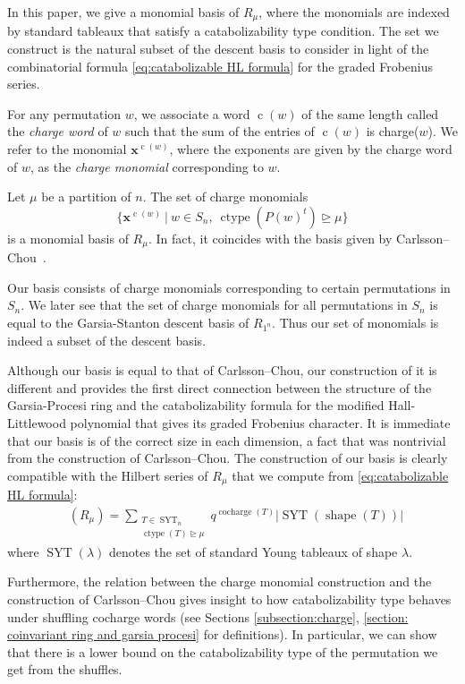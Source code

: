 \documentclass[10pt]{amsart}
\theoremstyle{plain}
\theoremstyle{definition}
\theoremstyle{plain}
\theoremstyle{plain}
\theoremstyle{remark}
\theoremstyle{plain}
\theoremstyle{plain}
\DeclareMathOperator{\cocharge}{cocharge}
\DeclareMathOperator{\syt}{SYT}
\DeclareMathOperator{\ctype}{ctype}
\DeclareMathOperator{\Hilb}{Hilb}
\DeclareMathOperator{\shape}{shape}
\DeclareMathOperator{\cw}{c}
\DeclareMathOperator{\Hilbq}{\Hilb_q}
\begin{document}
In this paper, we give a monomial basis of $R_{\mu}$, where the monomials are indexed by standard tableaux that satisfy a catabolizability type condition. 
The set we construct is the natural subset of the descent basis to consider in light of the combinatorial formula \eqref{eq:catabolizable HL formula} for the graded Frobenius series.


For any permutation $w$, we associate a word $\cw(w)$ of the same length called the \textit{charge word} of $w$ such that the sum of the entries of $\cw(w)$ is charge($w$).
We refer to the monomial $\mathbf{x}^{\cw(w)}$, where the exponents are given by the charge word of $w$, as the \textit{charge monomial} corresponding to $w$.


\begin{thm1}
\makeatletter{}\makeatother
 Let $\mu$ be a partition of $n$.
     The set of charge monomials 
     \[ \{\mathbf{x}^{\cw(w)}\ | \ w\in S_n, \ \ctype(P(w)^t)\unrhd\mu\}\]
    is a monomial basis of $R_{\mu}$.
    In fact, it coincides with the basis given by Carlsson--Chou~\cite{CC}.
\end{thm1}

Our basis consists of charge monomials corresponding to certain permutations in $S_n$. We later see that the set of charge monomials for all permutations in $S_n$ is equal to the Garsia-Stanton descent basis of $R_{1^n}$. Thus our set of monomials is indeed a subset of the descent basis.  

Although our basis is equal to that of Carlsson--Chou, our construction of it is different and provides the first direct connection between the structure of the Garsia-Procesi ring and the catabolizability formula for the modified Hall-Littlewood polynomial that gives its graded Frobenius character. 
It is immediate that our basis is of the correct size in each dimension, a fact that was nontrivial from the construction of Carlsson--Chou. 
The construction of our basis is clearly compatible with the Hilbert series of $R_{\mu}$ that we compute from \eqref{eq:catabolizable HL formula}:
\begin{align}
    \Hilbq(R_{\mu})= \sum\limits_{\substack{T\in \syt_n\\  \ctype(T)\unrhd\mu}}  q^{\cocharge(T)} |\syt(\shape(T))|
\end{align}
where $\syt(\lambda)$ denotes the set of standard Young tableaux of shape $\lambda$.

Furthermore, the relation between the charge monomial construction and the construction of Carlsson--Chou gives insight to how catabolizability type behaves under shuffling cocharge words  (see Sections \ref{subsection:charge}, \ref{section: coinvariant ring and garsia procesi} for definitions). In particular, we can show that there is a lower bound on the catabolizability type of the permutation we get from the shuffles.
\end{document}
